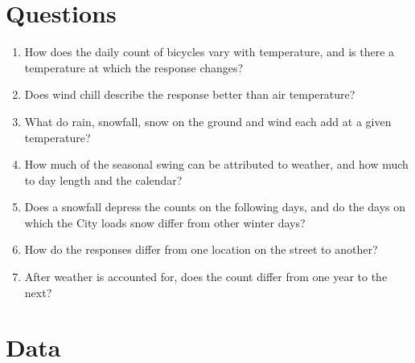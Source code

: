 \documentclass[11pt,a4paper]{article}
\begin{document}
\section{Questions}
\begin{enumerate}
\item How does the daily count of bicycles vary with temperature, and is there a temperature at which the response changes?
\item Does wind chill describe the response better than air temperature?
\item What do rain, snowfall, snow on the ground and wind each add at a given temperature?
\item How much of the seasonal swing can be attributed to weather, and how much to day length and the calendar?
\item Does a snowfall depress the counts on the following days, and do the days on which the City loads snow differ from other winter days?
\item How do the responses differ from one location on the street to another?
\item After weather is accounted for, does the count differ from one year to the next?
\end{enumerate}

\section{Data}
\end{document}
